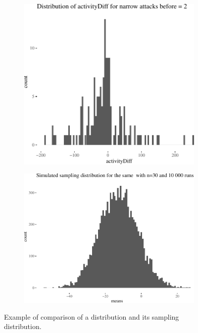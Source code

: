 \documentclass[10pt,]{scrartcl}
\begin{document}
\begin{figure}
\begin{subfigure}{0.4\textwidth}

\begin{center}\includegraphics{redditAnalysisWalkthrough_files/figure-latex/unnamed-chunk-38-1} \end{center}
\end{subfigure}\hfill
\begin{subfigure}{0.4\textwidth}

\begin{center}\includegraphics{redditAnalysisWalkthrough_files/figure-latex/unnamed-chunk-39-1} \end{center}
\end{subfigure}
\caption{Example of comparison of a distribution and its sampling distribution.}
\label{fig:sampling}
\end{figure}
\end{document}
